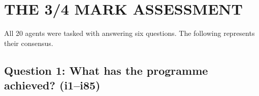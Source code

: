 \documentclass[11pt,a4paper]{article}
\begin{document}
\section{THE 3/4 MARK ASSESSMENT}

All 20 agents were tasked with answering six questions. The following represents their consensus.

\subsection{Question 1: What has the programme achieved? (i1--i85)}
\end{document}
